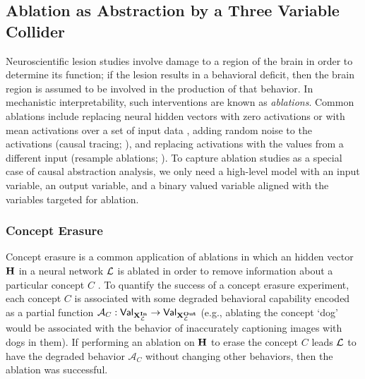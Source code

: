 \documentclass[twoside,11pt]{article}
\begin{document}
\subsection{Ablation as Abstraction by a Three Variable Collider}\label{sec:ablation}
Neuroscientific lesion studies involve damage to a region of the brain in order to determine its function; if the lesion results in a behavioral deficit, then the brain region is assumed to be involved in the production of that behavior. In mechanistic interpretability, such interventions are known as \textit{ablations}. Common ablations include replacing neural hidden vectors with zero activations \citep{cammarata2020thread,olsson2022context, geva2023dissecting} or with mean activations over a set of input data \citep{wang2023interpretability}, adding random noise to the activations (causal tracing; \citealt{Meng:2022, Meng23}), and replacing activations with the values from a different input (resample ablations; \citealt{chan2022causal}). To capture ablation studies as a special case of causal abstraction analysis, we only need a high-level model with an input variable, an output variable, and a binary valued variable aligned with the variables targeted for ablation. 

\subsubsection{Concept Erasure}
Concept erasure is a common application of ablations in which an hidden vector $\mathbf{H}$ in a neural network $\mathcal{L}$ is ablated in order to remove information about a particular concept $C$ \citep{Ravfogel:2020,linear_adversarial_concept_Eraser, kernelized_concept_Eraser,Ravfogel2023,Elazar-etal-2020, Lovering2022, olsson2022context, LEACE}. To quantify the success of a concept erasure experiment, each concept $C$ is associated with some degraded behavioral capability encoded as a partial function $\mathcal{A}_C:\mathsf{Val}_{\mathbf{X}^{\mathbf{In}}_{\mathcal{L}}} \to \mathsf{Val}_{\mathbf{X}^{\mathbf{Out}}_{\mathcal{L}}}$ (e.g., ablating the concept `dog' would be associated with the behavior of inaccurately captioning images with dogs in them). If performing an ablation on $\mathbf{H}$ to erase the concept $C$ leads $\mathcal{L}$ to have the degraded behavior $\mathcal{A}_C$ without changing other behaviors, then the ablation was successful.
\end{document}
